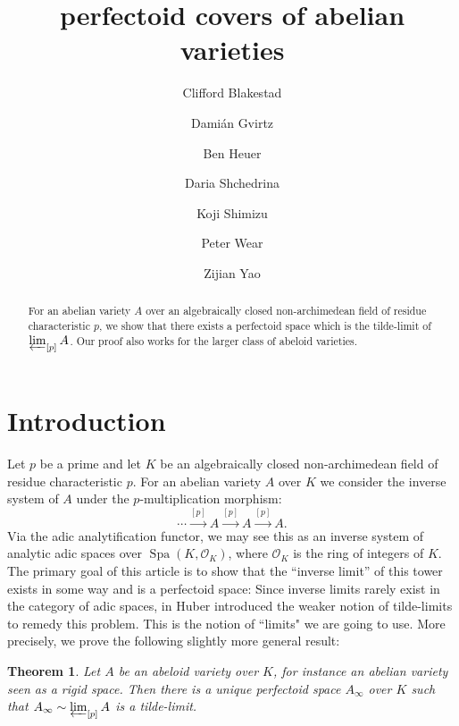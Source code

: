 \documentclass[10pt,oneside]{amsart}
\title[perfectoid covers of abelian varieties]{perfectoid  covers of abelian varieties}
\author{
	Clifford Blakestad \and
	Dami\'an Gvirtz \and
	Ben Heuer \and 
	Daria Shchedrina \and
	Koji Shimizu \and 
	Peter Wear \and
	Zijian Yao}
\newtheorem{mainthm}{Theorem}
\theoremstyle{definition}
\begin{document}
	
	\maketitle
	
	\begin{abstract}
For an abelian variety $A$ over an algebraically closed non-archimedean field of residue characteristic $p$, we show that there exists a perfectoid space which is the tilde-limit of $\varprojlim_{[p]}A$. Our proof also works for the larger class of abeloid varieties.
	\end{abstract}
	

	
	\section{Introduction} 

Let $p$ be a prime and let $K$ be an algebraically closed non-archimedean field of residue characteristic $p$.
For an abelian variety $A$ over $K$ we consider the inverse system of $A$ under the $p$-multiplication morphism:
\[\cdots\xrightarrow{[p]}A\xrightarrow{[p]}A\xrightarrow{[p]}A.\]
Via the adic analytification functor, we may see this as an inverse system of analytic adic spaces over $\operatorname{Spa}(K,\mathcal O_K)$, where $\mathcal O_K$ is the ring of integers of $K$.
The primary goal of this article is to show that the ``inverse limit'' of this tower exists in some way and is a perfectoid space: Since inverse limits rarely exist in the category of adic spaces, in \cite{huber2013etale} Huber introduced the weaker notion of tilde-limits to remedy this problem. This is the notion of ``limits" we are going to use. More precisely, we prove the following slightly more general result:

 


\begin{mainthm} \label{thm:main_thm_intro}
	Let $A$ be an abeloid variety over $K$, for instance an abelian variety seen as a rigid space. Then there is a unique perfectoid space $A_\infty$ over $K$ such that
	$A_\infty \sim \varprojlim_{[p]} A$ is a tilde-limit.
\end{mainthm}
\end{document}
